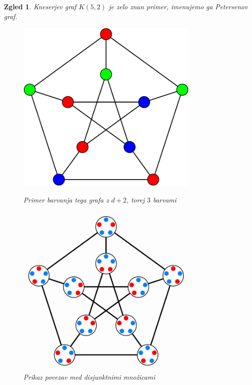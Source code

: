 \documentclass[a4paper,12pt]{article}
\newtheorem{zgled}{Zgled}
\begin{document}
\begin{zgled}{Kneserjev graf $K(5,2)$ je zelo znan primer, imenujemo ga Petersenov graf. 

\begin{figure}[h!]
	\centering
	\begin{minipage}{0.45\textwidth}
		\centering
		\includegraphics[width=0.8\textwidth]{petersenov_graf_barvanje}
        	\caption{Primer barvanja tega grafa z $d+2$, torej $3$ barvami}
    	\end{minipage}\hfill
    	\begin{minipage}{0.45\textwidth}
       	 \centering
        	 \includegraphics[width=0.8\textwidth]{petersenov_graf_mnozice}
       	 \caption{Prikaz povezav med disjunktnimi množicami}
    	\end{minipage}
\end{figure}
}

\end{zgled}
\end{document}

